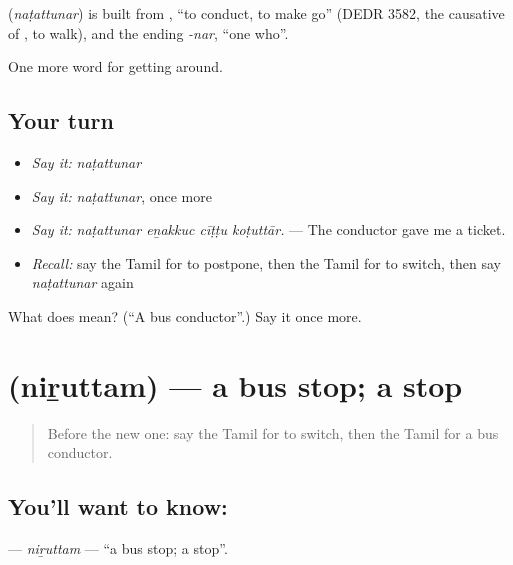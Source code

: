 \begin{cousinweb}
\textbf{} (\emph{naṭattunar}) is built from , \textquotedblleft{}to conduct, to make go\textquotedblright{} (DEDR 3582, the causative of , to walk), and the ending \emph{-nar}, \textquotedblleft{}one who\textquotedblright{}.
\end{cousinweb}

\begin{grammarlens}[title={What you've built}]
One more word for getting around.
\end{grammarlens}

\subsection*{Your turn}
\begin{itemize}
\raggedright
  \item \emph{Say it:} \emph{naṭattunar}
  \item \emph{Say it:} \emph{naṭattunar}, once more
  \item \emph{Say it:} \emph{naṭattunar eṉakkuc cīṭṭu koṭuttār.} — The conductor gave me a ticket.
  \item \emph{Recall:} say the Tamil for to postpone, then the Tamil for to switch, then say \emph{naṭattunar} again
\end{itemize}

\begin{tcolorbox}[breakable,colback=teal!4,colframe=teal!35!black,title={Before you move on}]
What does  mean? (\textquotedblleft{}A bus conductor\textquotedblright{}.) Say it once more.
\end{tcolorbox}
\section[\texorpdfstring{\ta{நிறுத்தம்} (niṟuttam)}{நிறுத்தம் (niṟuttam)}]{ (niṟuttam) — a bus stop; a stop}

\label{lesson:TA-C401-niruttam}



\begin{quote}
Before the new one: say the Tamil for to switch, then the Tamil for a bus conductor.
\end{quote}

\subsection*{You'll want to know: }
\textbf{} — \emph{niṟuttam} — \textquotedblleft{}a bus stop; a stop\textquotedblright{}.

